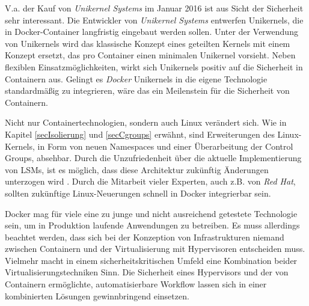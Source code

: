\documentclass[../main.tex]{subfiles}
\begin{document}
  V.a. der Kauf von \emph{Unikernel Systems} im Januar 2016 ist aus Sicht der Sicherheit sehr interessant. Die Entwickler von \emph{Unikernel Systems} entwerfen Unikernels, die in Docker-Container langfristig eingebaut werden sollen. Unter der Verwendung von Unikernels wird das klassische Konzept eines geteilten Kernels mit einem Konzept ersetzt, das pro Container einen minimalen Unikernel vorsieht. Neben flexiblen Einsatzmöglichkeiten, wirkt sich Unikernels positiv auf die Sicherheit in Containern aus. Gelingt es \emph{Docker} Unikernels in die eigene Technologie standardmäßig zu integrieren, wäre das ein Meilenstein für die Sicherheit von Containern.

  Nicht nur Containertechnologien, sondern auch Linux verändert sich. Wie in Kapitel \ref{secIsolierung} und \ref{secCgroups} erwähnt, sind Erweiterungen des Linux-Kernels, in Form von neuen Namespaces und einer Überarbeitung der Control Groups, absehbar. Durch die Unzufriedenheit über die aktuelle Implementierung von LSMs, ist es möglich, dass diese Architektur zukünftig Änderungen unterzogen wird \cite{https://lwn.net/Articles/443099/}. Durch die Mitarbeit vieler Experten, auch z.B. von \emph{Red Hat}, sollten zukünftige Linux-Neuerungen schnell in Docker integrierbar sein.

  Docker mag für viele eine zu junge und nicht ausreichend getestete Technologie sein, um in Produktion laufende Anwendungen zu betreiben. Es muss allerdings beachtet werden, dass sich bei der Konzeption von Infrastrukturen niemand zwischen Containern und der Virtualisierung mit Hypervisoren entscheiden muss. Vielmehr macht in einem sicherheitskritischen Umfeld eine Kombination beider Virtualisierungstechniken Sinn. Die Sicherheit eines Hypervisors und der von Containern ermöglichte, automatisierbare Workflow lassen sich in einer kombinierten Lösungen gewinnbringend einsetzen.



\end{document}

